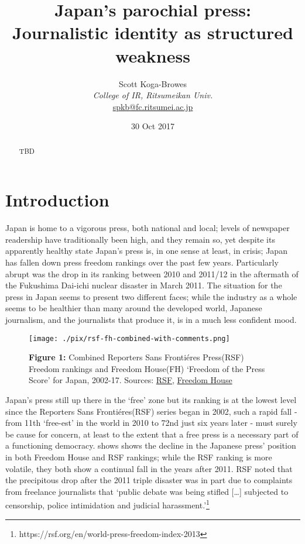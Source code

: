 \documentclass[11pt, headings=normal]{scrartcl}
\title{\bigskip \bigskip Japan's parochial press: Journalistic identity as structured weakness}
\author{\Large Scott Koga-Browes\vspace{0.05in} \\ \normalsize\emph{College of IR, Ritsumeikan Univ.} \\
\footnotesize \url{spkb@fc.ritsumei.ac.jp}\vspace*{0.2in}\newline
}
\date{\footnotesize 30 Oct 2017}
\begin{document}
\maketitle



\begin{abstract}
\noindent TBD
\end{abstract}

\hypertarget{introduction}{%
\section{Introduction}\label{introduction}}

Japan is home to a vigorous press, both national and local; levels of
newspaper readership have traditionally been high, and they remain so,
yet despite its apparently healthy state Japan's press is, in one sense
at least, in crisis; Japan has fallen down press freedom rankings over
the past few years. Particularly abrupt was the drop in its ranking
between 2010 and 2011/12 in the aftermath of the Fukushima Dai-ichi
nuclear disaster in March 2011. The situation for the press in Japan
seems to present two different faces; while the industry as a whole
seems to be healthier than many around the developed world, Japanese
journalism, and the journalists that produce it, is in a much less
confident mood.

\begin{figure}
\centering
\texttt{[image: ./pix/rsf-fh-combined-with-comments.png]}
\caption{\textbf{Figure 1:} Combined Reporters Sans Frontiéres
Press(RSF) Freedom rankings and Freedom House(FH) `Freedom of the Press
Score' for Japan, 2002-17. \label{fig:ranking}Sources:
\href{https://rsf.org/en/japan}{RSF},
\href{https://freedomhouse.org/report/freedom-press/2017/japan}{Freedom
House}}
\end{figure}

Japan's press still up there in the `free' zone but its ranking is at
the lowest level since the Reporters Sans Frontiéres(RSF) series began
in 2002, such a rapid fall - from 11th `free-est' in the world in 2010
to 72nd just six years later - must surely be cause for concern, at
least to the extent that a free press is a necessary part of a
functioning democracy.  shows shows the decline in the
Japanese press' position in both Freedom House and RSF rankings; while
the RSF ranking is more volatile, they both show a continual fall in the
years after 2011. RSF noted that the precipitous drop after the 2011
triple disaster was in part due to complaints from freelance journalists
that `public debate was being stifled {[}\ldots{}{]} subjected to
censorship, police intimidation and judicial harassment.'\footnote{https://rsf.org/en/world-press-freedom-index-2013}
\end{document}
